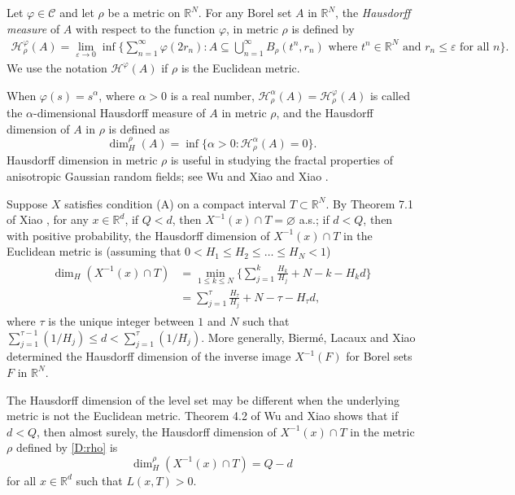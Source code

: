 \documentclass[11pt, reqno]{amsart}
\def\R{{\mathbb R}}
\def\eps{\varepsilon}
\numberwithin{equation}{section}
\begin{document}
Let $\varphi \in \mathscr{C}$ and let $\rho$ be a metric on $\R^N$. For any Borel set $A$ in $\R^N$, the 
\emph{Hausdorff measure} of $A$ with respect to the function $\varphi$, in metric $\rho$ is defined by
\begin{align*}
\mathcal{H}^\varphi_\rho(A) = \lim_{\eps \to 0} \inf\Bigg\{ \sum_{n=1}^\infty \varphi(2r_n) : A \subseteq 
\bigcup_{n=1}^\infty B_\rho(t^n, r_n) \text{ where } t^n \in \R^N \text{ and } r_n \le \eps \text{ for all } n \Bigg\}.
\end{align*}
We use the notation $\mathcal{H}^\varphi(A)$ if $\rho$ is the Euclidean metric.

When $\varphi(s) = s^\alpha$, where $\alpha > 0$ is a real number, $\mathcal{H}^\alpha_\rho(A) = \mathcal{H}^\varphi_\rho(A)$ 
is called the $\alpha$-dimensional Hausdorff measure of $A$ in metric $\rho$, and the Hausdorff dimension of $A$ in $\rho$ is 
defined as
\[ \dim_H^\rho(A) = \inf\{ \alpha > 0 : \mathcal{H}^\alpha_\rho(A) = 0 \}. \]
Hausdorff dimension in metric $\rho$ is useful in studying the fractal properties of anisotropic Gaussian random fields; see 
Wu and Xiao \cite{WX07} and Xiao \cite{X09}.

Suppose $X$ satisfies condition (A) on a compact interval $T \subset \R^N$. 
By Theorem 7.1 of Xiao \cite{X09}, for any $x \in \R^d$, if $Q < d$, then $X^{-1}(x) \cap T = \varnothing$ a.s.; if $d < Q$, 
then with positive probability, the Hausdorff dimension of $X^{-1}(x) \cap T$ in the Euclidean metric is 
(assuming that $0< H_1 \le H_2 \le \dots \le H_N < 1$)
\begin{align}
\begin{aligned}\label{Eq:Haus_meas_level_set_Euclidean}
\dim_H(X^{-1}(x) \cap T) &= \min_{1 \le k \le N}\bigg\{ \sum_{j=1}^k \frac{H_k}{H_j} + N - k - H_k d \bigg\}\\
& = \sum_{j=1}^\tau \frac{H_\tau}{H_j} + N - \tau - H_\tau d,
\end{aligned}
\end{align}
where $\tau$ is the unique integer between $1$ and $N$ such that $\sum_{j=1}^{\tau-1} (1/H_j) \le d < \sum_{j=1}^\tau (1/H_j)$.
More generally, Bierm\'e, Lacaux and Xiao \cite{BLX09} determined the Hausdorff dimension of the inverse image $X^{-1}(F)$ for 
Borel sets $F$ in $\R^N$. 

The Hausdorff dimension of the level set may be different when the underlying metric is not the Euclidean metric. 
Theorem 4.2 of Wu and Xiao \cite{WX11} shows that if $d < Q$, then almost surely, the Hausdorff dimension of 
$X^{-1}(x) \cap T$ in the metric $\rho$ defined by \eqref{D:rho} is 
\[ \dim_H^\rho(X^{-1}(x) \cap T) = Q - d \]
for all $x \in \R^d$ such that $L(x, T) > 0$.
\end{document}
